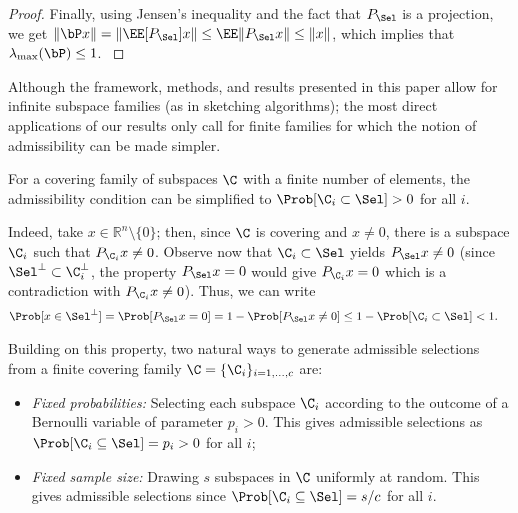 {\begin{proof}
{Finally, using Jensen's inequality and the fact that $P_{\Sel}$ is a projection, we get $\| \bP x \| = \| \EE[P_{\Sel}] x \|  \leq \EE \| P_{\Sel} x \| \leq \|x\|$, which implies that $\lambda_{\max}(\bP)\leq1$.  }
\end{proof}


{
Although the framework, methods, and results presented in this paper allow for infinite subspace families (as in sketching algorithms); the most direct applications of our results only call for finite families for which the notion of admissibility can be made simpler.
}


\begin{remark}
\label{rem:selection}
For a covering family of subspaces $\C$ with a finite number of elements, the admissibility condition can be simplified to  $\Prob[ \C_i \subset \Sel]>0$ for all $i$.

Indeed, take $x\in\mathbb{R}^n\setminus\{0\}$; then, since  $\C$ is covering and $x\neq 0$, there is a subspace $\C_i$ such that $P_{\C_i}x \neq 0$. Observe now that $\C_i \subset \Sel$ yields $P_{\Sel} x \neq 0$ (since $\Sel^\perp \subset  \C_i^\perp $, the property $P_{\Sel}x=0$ would give $P_{\C_i}x=0$ which is a contradiction with $P_{\C_i}x \neq 0$). Thus, we can write
\begin{align*}
    \Prob[x\in \Sel^\perp] &=  \Prob[P_{\Sel} x = 0] = 1 - \Prob[P_{\Sel} x \neq 0]  \leq 1 - \Prob[ \C_i \subset \Sel ] < 1.
\end{align*}

Building on this property, two natural ways to generate admissible selections from a finite covering family $\C=\{ \C_i \}_{i=1,\ldots,c}$ are:
\begin{itemize}
    \item \emph{Fixed probabilities:} Selecting each subspace $\C_i$ according to the outcome of a Bernoulli variable of parameter $p_i>0$. This gives admissible selections as $\Prob[\C_i \subseteq \Sel] = p_i >0$ for all $i$;
    \item \emph{Fixed sample size:} Drawing $s$ subspaces in $\C$ uniformly at random. This gives admissible selections since $ \Prob[\C_i \subseteq \Sel] = s/c$ for all $i$.\hfill
\end{itemize}
\end{remark}
}








